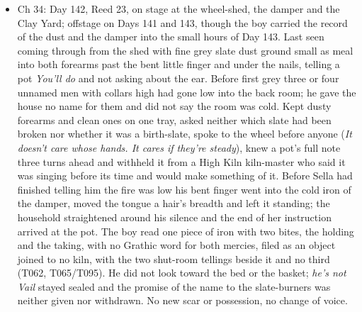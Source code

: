 \documentclass{design/chronicle}
\begin{document}
{\begin{itemize}[leftmargin=1.4em,itemsep=1pt,topsep=3pt,parsep=0pt]
\end{itemize}

\begin{itemize}[leftmargin=1.4em,itemsep=1pt,topsep=3pt,parsep=0pt]

\item Ch 34: Day 142, Reed 23, on stage at the wheel-shed, the damper and the Clay Yard; offstage on Days 141 and 143, though the boy carried the record of the dust and the damper into the small hours of Day 143. Last seen coming through from the shed with fine grey slate dust ground small as meal into both forearms past the bent little finger and under the nails, telling a pot \emph{You’ll do} and not asking about the ear. Before first grey three or four unnamed men with collars high had gone low into the back room; he gave the house no name for them and did not say the room was cold. Kept dusty forearms and clean ones on one tray, asked neither which slate had been broken nor whether it was a birth-slate, spoke to the wheel before anyone (\emph{It doesn’t care whose hands. It cares if they’re steady}), knew a pot’s full note three turns ahead and withheld it from a High Kiln kiln-master who said it was singing before its time and would make something of it. Before Sella had finished telling him the fire was low his bent finger went into the cold iron of the damper, moved the tongue a hair’s breadth and left it standing; the household straightened around his silence and the end of her instruction arrived at the pot. The boy read one piece of iron with two bites, the holding and the taking, with no Grathic word for both mercies, filed as an object joined to no kiln, with the two shut-room tellings beside it and no third (T062, T065/T095). He did not look toward the bed or the basket; \emph{he’s not Vail} stayed sealed and the promise of the name to the slate-burners was neither given nor withdrawn. No new scar or possession, no change of voice.

\end{itemize}

\begin{itemize}[leftmargin=1.4em,itemsep=1pt,topsep=3pt,parsep=0pt]


\end{itemize}}
\end{document}
